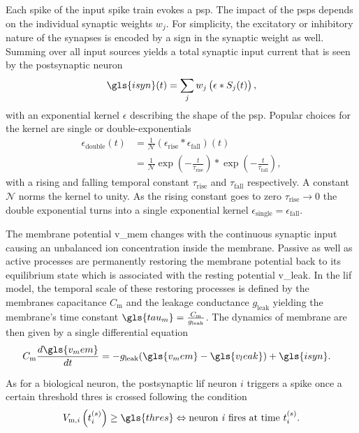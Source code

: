 Each spike of the input spike train evokes a \gls{psp}. The impact of the \glspl{psp} depends on the individual synaptic weights $w_j$. For simplicity, the excitatory or inhibitory nature of the synapses is encoded by a sign in the synaptic weight as well. Summing over all input sources yields a total synaptic input current that is seen by the postsynaptic neuron
\begin{equation}
\gls{isyn}(t) = \sum_j w_j \left(\epsilon \ast S_j(t)\right),
\label{synaptic_input}
\end{equation}
with an exponential kernel $\epsilon$ describing the shape of the \gls{psp}. Popular choices for the kernel are single or double-exponentials
\begin{align*}
\epsilon_\text{double}(t) 	&=\frac{1}{\mathcal{N}} \left(\epsilon_\text{rise} \ast \epsilon_\text{fall}\right)(t) \\
&=\frac{1}{\mathcal{N}}\exp \left(-\frac{t}{\tau_\text{rise}} \right)  \ast \exp \left(-\frac{t}{\tau_\text{fall}} \right), 
\end{align*}
with a rising and falling temporal constant $\tau_\text{rise}$ and $\tau_\text{fall}$ respectively. A constant $\mathcal{N}$ norms the kernel to unity. As the rising constant goes to zero $\tau_\text{rise} \rightarrow 0$ the double exponential turns into a single exponential kernel $\epsilon_\text{single} = \epsilon_\text{fall}$.

The membrane potential \gls{v_mem} changes with the continuous synaptic input causing an unbalanced ion concentration inside the membrane. Passive as well as active processes are permanently restoring the membrane potential back to its equilibrium state which is associated with the resting potential \gls{v_leak}. In the \gls{lif} model, the temporal scale of these restoring processes is defined by the membranes capacitance $C_\text{m}$ and the leakage conductance $g_\text{leak}$ yielding the membrane's time constant $\gls{tau_m} = \frac{C_\text{m}}{g_\text{leak}}$. The dynamics of membrane are then given by a single differential equation
\begin{align}
\label{lifeq}
C_{\text{m}} \frac{d\gls{v_mem}}{dt} &= -g_{\text{leak}} (\gls{v_mem} - \gls{v_leak}) + \gls{isyn}.
\end{align}

As for a biological neuron, the postsynaptic \gls{lif} neuron $i$ triggers a spike once a certain threshold \gls{thres} is crossed following the condition
\begin{equation*}
V_{\text{m}, i}\left(t_i^{(s)}\right) \ge \gls{thres} \Leftrightarrow \text{neuron \textit{i} fires at time } t_i^{(s)}.
\end{equation*}

